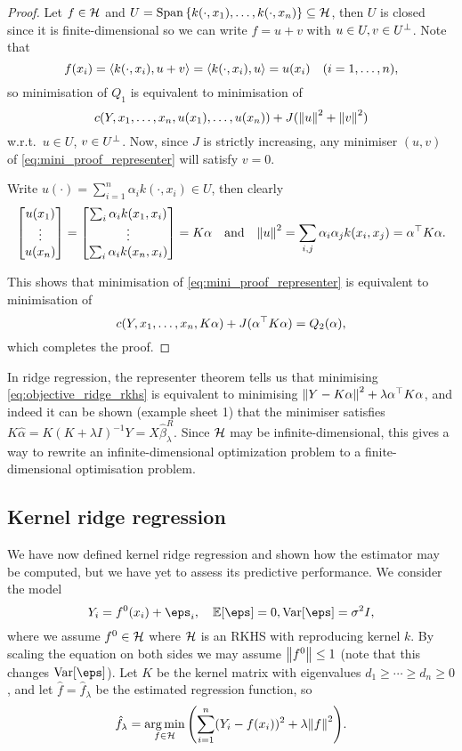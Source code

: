 \begin{proof}
	Let $f \in \HH$ and $U = \Span\qty{k(\cdot, x_1), \dotsc, k(\cdot, x_n)} \subseteq \HH$, then $U$ is closed since it is finite-dimensional so we can write $f = u + v$ with $u \in U, v \in U\P$. Note that
	\[
	f(x_i) = \ang{k(\cdot, x_i), u+v} = \ang{k(\cdot, x_i), u} = u(x_i) \quad(i = 1, \dotsc, n),
	\]
	so minimisation of $Q_1$ is equivalent to minimisation of
	\begin{equation} \label{eq:mini_proof_representer}
	c(Y, x_1, \dotsc, x_n, u(x_1), \dotsc, u(x_n)) + J(\norm{u}^2 + \norm{v}^2)
	\end{equation}
	w.r.t.\ $u \in U$, $v \in U\P$. Now, since $J$ is strictly increasing, any minimiser $(u, v)$ of  \cref{eq:mini_proof_representer} will satisfy $v = 0$.
	
	Write $u(\cdot) = \sum_{i=1}^n \alpha_i k(\cdot, x_i) \in U$, then clearly
	\[
	\mqty[ u(x_1) \\ \vdots \\ u(x_n)] = \mqty[ \sum_i \alpha_i k(x_1, x_i) \\ \vdots \\ \sum_i \alpha_i k(x_n, x_i)] = K\alpha \quad\text{and}\quad\norm{u}^2 = \sum_{i, j} \alpha_i \alpha_j k(x_i, x_j) = \alpha\T K \alpha. 
	\]
	
	This shows that minimisation of \cref{eq:mini_proof_representer} is equivalent to minimisation of
	\[
	c(Y, x_1, \dotsc, x_n, K\alpha) + J(\alpha\T K\alpha) = Q_2(\alpha), 
	\]
	which completes the proof. 
\end{proof}

\begin{example}
	In ridge regression, the representer theorem tells us that minimising \cref{eq:objective_ridge_rkhs} is equivalent to minimising $\norm{Y - K\alpha}^2 + \lambda \alpha\T K\alpha$, and indeed it can be shown (example sheet 1) that the minimiser satisfies $K\hat\alpha = K(K+\lambda I)^{-1} Y = X\hat\beta_\lambda^R$. Since $\HH$ may be infinite-dimensional, this gives a way to rewrite an infinite-dimensional optimization problem to a finite-dimensional optimisation problem. 
\end{example}

\subsection{Kernel ridge regression}
We have now defined kernel ridge regression and shown how the estimator may be computed, but we have yet to assess its predictive performance. We consider the model
\[
Y_i = f^0(x_i) + \eps_i, \quad \EE[\eps] = 0, \Var[\eps] = \sigma^2 I, 
\]
where we assume $f^0 \in \HH$ where $\HH$ is an RKHS with reproducing kernel $k$. By scaling the equation on both sides we may assume $\norm{f^0} \leq 1$ (note that this changes $\Var[\eps]$). Let $K$ be the kernel matrix with eigenvalues $d_1 \geq \dotsb \geq d_n \geq 0$, and let $\hat f = \hat f_\lambda$ be the estimated regression function, so
\[
\hat f_\lambda = \argmin_{f \in \HH} \qty(\sum_{i=1}^n (Y_i - f(x_i))^2 + \lambda \norm{f}^2). 
\]

